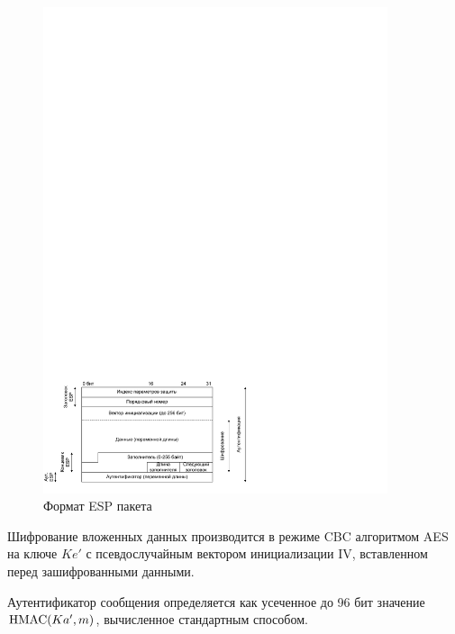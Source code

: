 \begin{figure}[!ht]
	\centering
	\includegraphics[width=0.9\textwidth]{pic/ipsec-esp}
	\caption{Формат ESP пакета\label{fig:ipsec-esp}}
\end{figure}

Шифрование вложенных данных производится в режиме CBC алгоритмом AES на ключе $Ke'$ с псевдослучайным вектором инициализации IV, вставленном перед зашифрованными данными.

Аутентификатор сообщения определяется как усеченное до 96 бит значение $\textrm{HMAC}(Ka', m)$, вычисленное стандартным способом.

